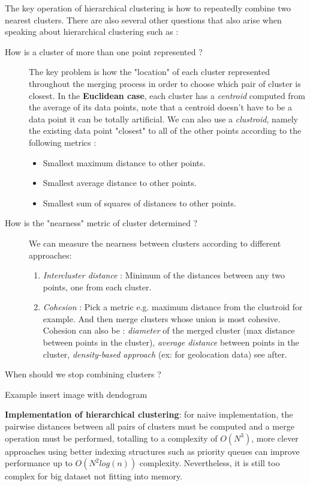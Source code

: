 The key operation of hierarchical clustering is how to repeatedly combine two nearest clusters. There are also several other questions that also arise when speaking about hierarchical clustering such as :
\begin{description}
	\item [How is a cluster of more than one point represented ?]
The key problem is how the "location" of each cluster represented throughout the merging process in order to choose which pair of cluster is closest. In the \textbf{Euclidean case}, each cluster has a \emph{centroid} computed from the average of its data points, note that a centroid doesn't have to be a data point it can be totally artificial. We can also use a \emph{clustroid}, namely the existing data point "closest" to all of the other points according to the following metrics :
\begin{itemize}
	\item Smallest maximum distance to other points.
	\item Smallest average distance to other points.
	\item Smallest sum of squares of distances to other points.
\end{itemize}
	\item [How is the "nearness" metric of cluster determined ?]
We can measure the nearness between clusters according to different approaches:
\begin{enumerate}
	\item \emph{Intercluster distance} : Minimum of the distances between any two points, one from each cluster.
	\item \emph{Cohesion} : Pick a metric e.g. maximum distance from the clustroid for example. And then merge clusters whose union is most cohesive. Cohesion can also be : \emph{diameter} of the merged cluster (max distance between points in the cluster), \emph{average distance} between points in the cluster, \emph{density-based approach} (ex: for geolocation data) see after.
\end{enumerate} 
	\item [When should we stop combining clusters ?]
\end{description}

Example insert image with dendogram

\textbf{Implementation of hierarchical clustering}: for naive implementation, the pairwise distances between all pairs of clusters must be computed and a merge operation must be performed, totalling to a complexity of $O(N^{3})$, more clever approaches using better indexing structures such as priority queues can improve performance up to $O(N^{2}log(n))$ complexity. Nevertheless, it is still too complex for big dataset not fitting into memory.

